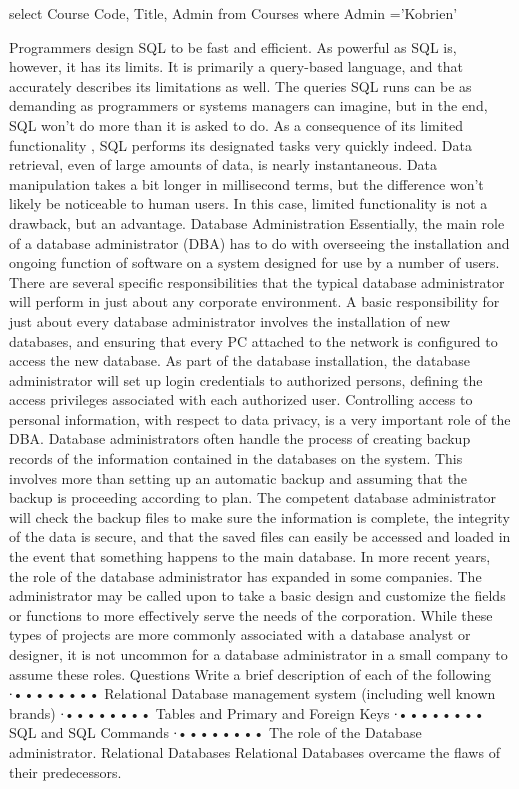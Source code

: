 \documentclass[]{article}
\begin{document}
select Course Code,  Title,    Admin
from   Courses
 where Admin ='Kobrien'

 
Programmers design SQL to be fast and efficient. As powerful as SQL is, however, it has its limits. It is primarily a query-based language, and that accurately describes its limitations as well. The queries SQL runs can be as demanding as programmers or systems managers can imagine, but in the end, SQL won't do more than it is asked to do.
As a consequence of its limited functionality , SQL performs its designated tasks very quickly indeed. Data retrieval, even of large amounts of data, is nearly instantaneous. Data manipulation takes a bit longer in millisecond terms, but the difference won't likely be noticeable to human users. In this case, limited functionality is not a drawback, but an advantage.
Database Administration
Essentially, the main role of a database administrator (DBA) has to do with overseeing the installation and ongoing function of software on a system designed for use by a number of users. There are several specific responsibilities that the typical database administrator will perform in just about any corporate environment.
A basic responsibility for just about every database administrator involves the installation of new databases, and ensuring  that every PC attached to the network is configured to access the new database.
As part of the database installation, the database administrator will set up login credentials to authorized persons, defining the access privileges associated with each authorized user. Controlling access to personal information, with respect to data privacy, is a very important role of the DBA.
Database administrators often handle the process of creating backup records of the information contained in the databases on the system. This involves more than setting up an automatic backup and assuming that the backup is proceeding according to plan. The competent database administrator will check the backup files to make sure the information is complete, the integrity of the data is secure, and that the saved files can easily be accessed and loaded in the event that something happens to the main database.
In more recent years, the role of the database administrator has expanded in some companies. The administrator may be called upon to take a basic design and customize the fields or functions to more effectively serve the needs of the corporation. While these types of projects are more commonly associated with a database analyst or designer, it is not uncommon for a database administrator in a small company to assume these roles.
Questions
Write a brief description of each of the following
∙•••••••• Relational Database management system  (including well known brands)
∙•••••••• Tables and Primary and Foreign Keys
∙•••••••• SQL and SQL Commands
∙•••••••• The role of the Database administrator.
Relational Databases
Relational Databases overcame the flaws of their predecessors.
\end{document}
